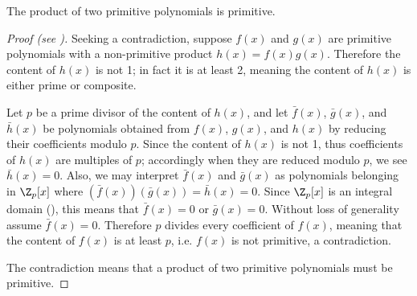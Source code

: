 \begin{lemma}[Gauss]\label{lemma-gauss}
    The product of two primitive polynomials is primitive.
\end{lemma}
\begin{proof}[Proof (see {\cite[p.~291]{gallian_2016}})]
    Seeking a contradiction, suppose $f(x)$ and $g(x)$ are primitive polynomials with a non-primitive product $h(x) = f(x)g(x)$. Therefore the content of $h(x)$ is not 1; in fact it is at least 2, meaning the content of $h(x)$ is either prime or composite.
    
    Let $p$ be a prime divisor of the content of $h(x)$, and let $\bar{f}(x)$, $\bar{g}(x)$, and $\bar{h}(x)$ be polynomials obtained from $f(x)$, $g(x)$, and $h(x)$ by reducing their coefficients modulo $p$. Since the content of $h(x)$ is not 1, thus coefficients of $h(x)$ are multiples of $p$; accordingly when they are reduced modulo $p$, we see $\bar{h}(x) = 0$. Also, we may interpret $\bar{f}(x)$ and $\bar{g}(x)$ as polynomials belonging in $\Z_p[x]$ where $(\bar{f}(x))(\bar{g}(x)) = \bar{h}(x) = 0$. Since $\Z_p[x]$ is an integral domain (), this means that $\bar{f}(x) = 0$ or $\bar{g}(x) = 0$. Without loss of generality assume $\bar{f}(x) = 0$. Therefore $p$ divides every coefficient of $f(x)$, meaning that the content of $f(x)$ is at least $p$, i.e. $f(x)$ is not primitive, a contradiction.

    The contradiction means that a product of two primitive polynomials must be primitive.
\end{proof}

